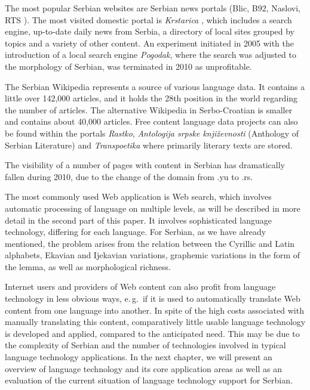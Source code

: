 {\begin{multicols}{2}
The most popular Serbian websites are Serbian news portals (Blic, \cite{BLIC} B92, \cite{B92} Naslovi, \cite{NASLOVI} RTS \cite{RTS}). The most visited domestic portal is \textit{Krstarica} \cite{KRSTARICA}, which includes a search engine, up-to-date daily news from Serbia, a directory of local sites grouped by topics and a variety of other content. An experiment initiated in 2005 with the introduction of a local search engine \textit{Pogodak}, where the search was adjusted to the morphology of Serbian, was terminated in 2010 as unprofitable.

The Serbian Wikipedia represents a source of various language data. It contains a little over 142,000 articles, and it holds the 28th position \cite{WIKI} in the world regarding the number of articles. The alternative Wikipedia in Serbo-Croatian \cite{SHWIKI} is smaller and contains about 40,000 articles. Free content language data projects can also be found within the portals \textit{Rastko}, \cite{RASTKO} \textit{Antologija srpske književnosti} \cite{ASK} (Anthology of Serbian Literature) and \textit{Transpoetika} \cite{TRPOET} where primarily literary texts are stored. 

The visibility of a number of pages with content in Serbian has dramatically fallen during 2010, due to the change of the domain from .yu to .rs. 

The most commonly used Web application is Web search, which involves automatic processing of language on multiple levels, as will be described in more detail in the second part of this paper. It involves sophisticated language technology, differing for each language. For Serbian, as we have already mentioned, the problem arises from the relation between the Cyrillic and Latin alphabets, Ekavian and Ijekavian variations, graphemic variations in the form of the lemma, as well as morphological richness. 

Internet users and providers of Web content can also profit from language technology in less obvious ways, e.\,g.~if it is used to automatically translate Web content from one language into another. In spite of the high costs associated with manually translating this content, comparatively little usable language technology is developed and applied, compared to the anticipated need. This may be due to the complexity of Serbian and the number of technologies involved in typical language technology applications. In the next chapter, we will present an overview of language technology and its core application areas as well as an evaluation of the current situation of language technology support for Serbian.  
\end{multicols}

}
